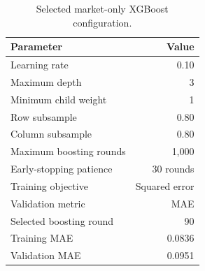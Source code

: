 \begin{table}[!htbp]
\centering
\footnotesize
\caption{Selected market-only XGBoost configuration.}
\label{tab:selected-xgboost-configuration}
\begin{tabular}{lr}
\toprule
Parameter & Value \\
\midrule
Learning rate & 0.10 \\
Maximum depth & 3 \\
Minimum child weight & 1 \\
Row subsample & 0.80 \\
Column subsample & 0.80 \\
Maximum boosting rounds & 1,000 \\
Early-stopping patience & 30 rounds \\
Training objective & Squared error \\
Validation metric & MAE \\
Selected boosting round & 90 \\
Training MAE & 0.0836 \\
Validation MAE & 0.0951 \\
\bottomrule
\end{tabular}
\end{table}
